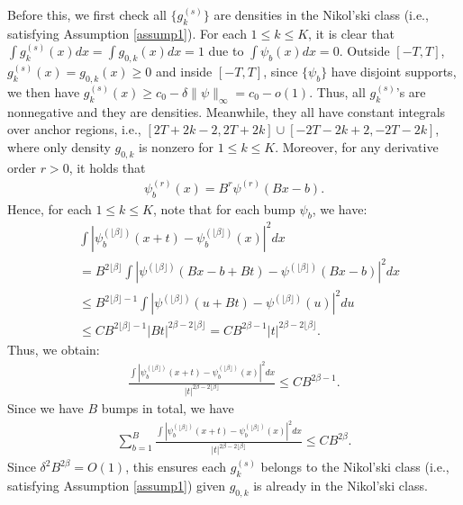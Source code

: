 \documentclass[preprint,11pt]{article}
\numberwithin{equation}{section}
\begin{document}
Before this, we first check all $\{g_k^{(s)}\}$ are densities in the Nikol’ski class (i.e., satisfying Assumption \ref{assump1}). For each $1\le k\le K$, it is clear that $\int g_k^{(s)}(x)dx=\int g_{0,k}(x)dx=1$ due to $\int \psi_b(x)dx=0$. Outside $[-T,T]$, $g_k^{(s)}(x)=g_{0,k}(x)\ge 0$ and inside $[-T,T]$, since $\{\psi_b\}$ have disjoint supports, we then have $g_k^{(s)}(x)\ge c_0-\delta\|\psi\|_{\infty}=c_0-o(1)$. Thus, all $g_k^{(s)}$'s are nonnegative and they are densities. Meanwhile, they all have constant integrals over anchor regions, i.e., $[2T+2k-2,2T+2k]\cup[-2T-2k+2,-2T-2k]$, where only density $g_{0,k}$ is nonzero for $1\le k\le K$. Moreover, for any derivative order $r>0$, it holds that
\begin{align*}
    \psi^{(r)}_b(x)=B^r\psi^{(r)}(Bx-b).
\end{align*}
Hence, for each $1\le k\le K$, note that for each bump $\psi_b$, we have:
\begin{align*}
    &\int \left| \psi_b^{(\lfloor\beta\rfloor)}(x + t) - \psi_b^{(\lfloor\beta\rfloor)}(x) \right|^2 dx\\
    &= B^{2\lfloor\beta\rfloor}\int \left| \psi^{(\lfloor\beta\rfloor)}(Bx-b + Bt) - \psi^{(\lfloor\beta\rfloor)}(Bx-b) \right|^2 dx\\
    &\le B^{2\lfloor\beta\rfloor-1}\int \left| \psi^{(\lfloor\beta\rfloor)}(u + Bt) - \psi^{(\lfloor\beta\rfloor)}(u) \right|^2 du \\
    &\le C B^{2\lfloor\beta\rfloor-1}|Bt|^{2\beta-2\lfloor\beta\rfloor}=CB^{2\beta-1}|t|^{2\beta-2\lfloor\beta\rfloor}.
\end{align*}
Thus, we obtain:
\begin{align*}
    \frac{\int \left| \psi_b^{(\lfloor\beta\rfloor)}(x + t) - \psi_b^{(\lfloor\beta\rfloor)}(x) \right|^2dx}{|t|^{2\beta-2\lfloor\beta\rfloor}}\le CB^{2\beta-1}.
\end{align*}
Since we have $B$ bumps in total, we have 
\begin{align*}
    \sum_{b=1}^B\frac{\int \left| \psi_b^{(\lfloor\beta\rfloor)}(x + t) - \psi_b^{(\lfloor\beta\rfloor)}(x) \right|^2dx}{|t|^{2\beta-2\lfloor\beta\rfloor}}\le CB^{2\beta}.
\end{align*}
Since $\delta^2B^{2\beta}=O(1)$, this ensures each $g_k^{(s)}$ belongs to the Nikol’ski class (i.e., satisfying Assumption \ref{assump1}) given $g_{0,k}$ is already in the Nikol’ski class.
\end{document}

